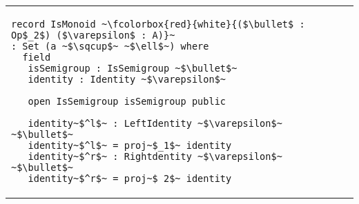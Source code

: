 \begin{adjustbox}{width=1.2\columnwidth,center}
\begin{tabular}{p{7cm} p{7cm} p{7cm}}
\begin{verbatim}
record IsMonoid ~\fcolorbox{red}{white}{($\bullet$ : Op$_2$) ($\varepsilon$ : A)}~ 
: Set (a ~$\sqcup$~ ~$\ell$~) where 
  field 
   isSemigroup : IsSemigroup ~$\bullet$~ 
   identity : Identity ~$\varepsilon$~ 
       
   open IsSemigroup isSemigroup public 
   
   identity~$^l$~ : LeftIdentity ~$\varepsilon$~ ~$\bullet$~ 
   identity~$^l$~ = proj~$_1$~ identity 
   identity~$^r$~ : Rightdentity ~$\varepsilon$~ ~$\bullet$~ 
   identity~$^r$~ = proj~$_2$~ identity        
\end{verbatim}       
\end{tabular}  
\end{adjustbox}
